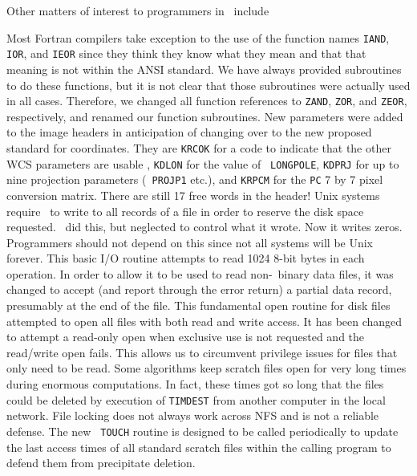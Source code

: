 Other matters of interest to programmers in \RELEASENAME\ include
\vspace{-10pt}
\begin{description}
 Most Fortran compilers take exception to the use of
   the function names {\tt IAND}, {\tt IOR}, and {\tt IEOR} since they
   think they know what they mean and that that meaning is not within
   the ANSI standard.  We have always provided subroutines to do these
   functions, but it is not clear that those subroutines were actually
   used in all cases.  Therefore, we changed all function references
   to {\tt ZAND}, {\tt ZOR}, and {\tt ZEOR}, respectively, and renamed
   our function subroutines.
 New parameters were added to the image headers in
   anticipation of changing over to the new proposed standard for
   coordinates.  They are {\tt KRCOK} for a code to indicate that the
   other WCS parameters are usable , {\tt KDLON} for the value of {\tt
   LONGPOLE}, {\tt KDPRJ} for up to nine projection parameters ({\tt
   PROJP1} etc.), and {\tt KRPCM} for the {\tt PC} 7 by 7 pixel
   conversion matrix. There are still 17 free words in the header!
 Unix systems require \AIPS\ to write to all records of
   a file in order to reserve the disk space requested.  \AIPS\ did
   this, but neglected to control what it wrote.  Now it writes zeros.
   Programmers should not depend on this since not all systems will be
   Unix forever.
  This basic I/O routine attempts to read 1024 8-bit
   bytes in each operation.  In order to allow it to be used to read
   non-\AIPS\ binary data files, it was changed to accept (and report
   through the error return) a partial data record, presumably at the
   end of the file.
 This fundamental open routine for disk files attempted
   to open all files with both read and write access.  It has been
   changed to attempt a read-only open when exclusive use is not
   requested and the read/write open fails.  This allows us to
   circumvent privilege issues for files that only need to be read.
 Some algorithms keep scratch files open for very long
   times during enormous computations.  In fact, these times got so
   long that the files could be deleted by execution of {\tt TIMDEST}
   from another computer in the local network.  File locking does not
   always work across NFS and is not a reliable defense.  The new {\tt
   TOUCH} routine is designed to be called periodically to update the
   last access times of all standard scratch files within the calling
   program to defend them from precipitate deletion.
\end{description}


